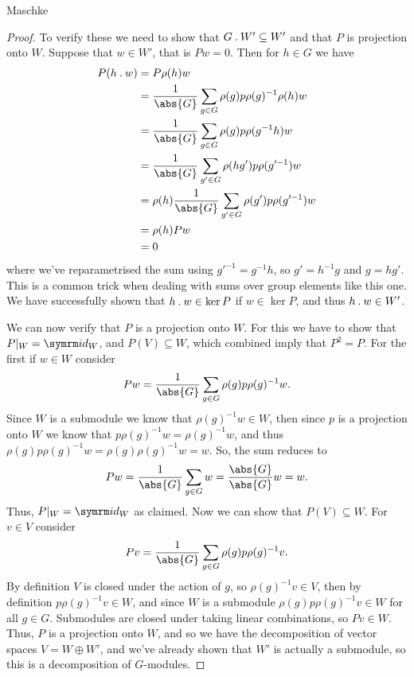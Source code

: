 \begin{thm}{Maschke}{}
\begin{proof}
        To verify these we need to show that \(G \mathbin{.} W' \subseteq W'\) and that \(P\) is projection onto \(W\).
        Suppose that \(w \in W'\), that is \(Pw = 0\).
        Then for \(h \in G\) we have
        \begin{align}
            P(h \action w) &= P\rho(h)w\\
            &= \frac{1}{\abs{G}} \sum_{g \in G} \rho(g) p \rho(g)^{-1}\rho(h)w\\
            &= \frac{1}{\abs{G}} \sum_{g \in G} \rho(g) p \rho(g^{-1}h) w\\
            &= \frac{1}{\abs{G}} \sum_{g' \in G} \rho(hg') p \rho(g'^{-1}) w\\
            &= \rho(h) \frac{1}{\abs{G}} \sum_{g' \in G} \rho(g') p \rho(g'^{-1}) w\\
            &= \rho(h) P w\\
            &= 0
        \end{align}
        where we've reparametrised the sum using \(g'^{-1} = g^{-1}h\), so \(g' = h^{-1} g\) and \(g = hg'\).
        This is a common trick when dealing with sums over group elements like this one.
        We have successfully shown that \(h \mathbin{.} w \in \ker P\) if \(w \in \ker P\), and thus \(h \mathbin{.} w \in W'\).
        
        We can now verify that \(P\) is a projection onto \(W\).
        For this we have to show that \(P|_W = \id_W\), and \(P(V) \subseteq W\), which combined imply that \(P^2 = P\).
        For the first if \(w \in W\) consider
        \begin{equation}
            Pw = \frac{1}{\abs{G}} \sum_{g \in G} \rho(g) p \rho(g)^{-1}w.
        \end{equation}
        Since \(W\) is a submodule we know that \(\rho(g)^{-1}w \in W\), then since \(p\) is a projection onto \(W\) we know that \(p\rho(g)^{-1}w = \rho(g)^{-1}w\), and thus \(\rho(g)p\rho(g)^{-1}w = \rho(g)\rho(g)^{-1}w = w\).
        So, the sum reduces to
        \begin{equation}
            Pw = \frac{1}{\abs{G}} \sum_{g \in G} w = \frac{\abs{G}}{\abs{G}} w = w.
        \end{equation}
        Thus, \(P|_W = \id_W\) as claimed.
        Now we can show that \(P(V) \subseteq W\).
        For \(v \in V\) consider
        \begin{equation}
            Pv = \frac{1}{\abs{G}} \sum_{g \in G} \rho(g) p \rho(g)^{-1}v.
        \end{equation}
        By definition \(V\) is closed under the action of \(g\), so \(\rho(g)^{-1}v \in V\), then by definition \(p \rho(g)^{-1} v \in W\), and since \(W\) is a submodule \(\rho(g)p\rho(g)^{-1} v \in W\) for all \(g \in G\).
        Submodules are closed under taking linear combinations, so \(Pv \in W\).
        Thus, \(P\) is a projection onto \(W\), and so we have the decomposition of vector spaces \(V = W \oplus W'\), and we've already shown that \(W'\) is actually a submodule, so this is a decomposition of \(G\)-modules.
    \end{proof}
\end{thm}

